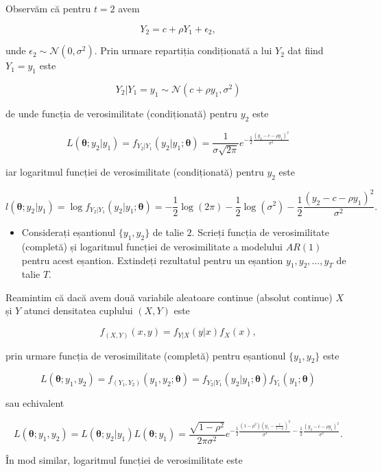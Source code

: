 \documentclass[]{article}
\newenvironment{frshaded*}{%
  \def\FrameCommand{\fboxrule=\FrameRule\fboxsep=\FrameSep \fcolorbox{framecolor}{shadecolor1}}%
  \MakeFramed {\advance\hsize-\width \FrameRestore}}%
{\endMakeFramed}
\newenvironment{rmdblock}[1]
  {\begin{frshaded*}
  \begin{itemize}
  \renewcommand{\labelitemi}{
    \raisebox{-.7\height}[0pt][0pt]{
      {\setkeys{Gin}{width=2em,keepaspectratio}\texttt{[image: images/icons/\#1]}}
    }
  }
  \item
  }
  {
  \end{itemize}
  \end{frshaded*}
  }
\newenvironment{rmdexercise}
  {\begin{rmdblock}{exercise}}
  {\end{rmdblock}}
\begin{document}
Observăm că pentru \(t=2\) avem

\[
  Y_2 = c + \rho Y_1 + \epsilon_2,
\]

unde \(\epsilon_2\sim\mathcal{N}(0,\sigma^2)\). Prin urmare repartiția
condiționată a lui \(Y_2\) dat fiind \(Y_1 = y_1\) este

\[
  Y_2|Y_1=y_1\sim\mathcal{N}(c+\rho y_1,\sigma^2)
\]

de unde funcția de verosimilitate (condiționată) pentru \(y_2\) este

\[
  L(\boldsymbol{\theta};y_2|y_1) = f_{Y_2|Y_1}(y_2|y_1;\boldsymbol{\theta}) = \frac{1}{\sigma\sqrt{2\pi}}e^{-\frac{1}{2}\frac{\left(y_2 - c-\rho y_1\right)^2}{\sigma^2}}
\]

iar logaritmul funcției de verosimilitate (condiționată) pentru \(y_2\)
este

\[
  l(\boldsymbol{\theta};y_2|y_1) = \log f_{Y_2|Y_1}(y_2|y_1;\boldsymbol{\theta}) = -\frac{1}{2}\log(2\pi) - \frac{1}{2}\log\left(\sigma^2\right)-\frac{1}{2}\frac{\left(y_2 - c-\rho y_1\right)^2}{\sigma^2}.
\]

\begin{rmdexercise}
Considerați eșantionul \(\{y_1, y_2\}\) de talie \(2\). Scrieți funcția
de verosimilitate (completă) și logaritmul funcției de verosimilitate a
modelului \(AR(1)\) pentru acest eșantion. Extindeți rezultatul pentru
un eșantion \(y_1,y_2,\ldots,y_T\) de talie \(T\).
\end{rmdexercise}

Reamintim că dacă avem două variabile aleatoare continue (absolut
continue) \(X\) și \(Y\) atunci densitatea cuplului \((X,Y)\) este

\[
  f_{(X,Y)}(x,y) = f_{Y|X}(y|x)f_{X}(x),
\]

prin urmare funcția de verosimilitate (completă) pentru eșantionul
\(\{y_1, y_2\}\) este

\[
  L(\boldsymbol{\theta};y_1,y_2) = f_{(Y_1,Y_2)}(y_1,y_2;\boldsymbol{\theta}) = f_{Y_2|Y_1}(y_2|y_1;\boldsymbol{\theta})f_{Y_1}(y_1;\boldsymbol{\theta})
\]

sau echivalent

\[
  L(\boldsymbol{\theta};y_1,y_2) = L(\boldsymbol{\theta};y_2|y_1)L(\boldsymbol{\theta};y_1) = \frac{\sqrt{1-\rho^2}}{2 \pi\sigma^2}e^{-\frac{1}{2}\frac{(1-\rho^2)\left(y_1 - \frac{c}{1-\rho}\right)^2}{\sigma^2}-\frac{1}{2}\frac{\left(y_2 - c-\rho y_1\right)^2}{\sigma^2}}.
\]

În mod similar, logaritmul funcției de verosimilitate este
\end{document}
